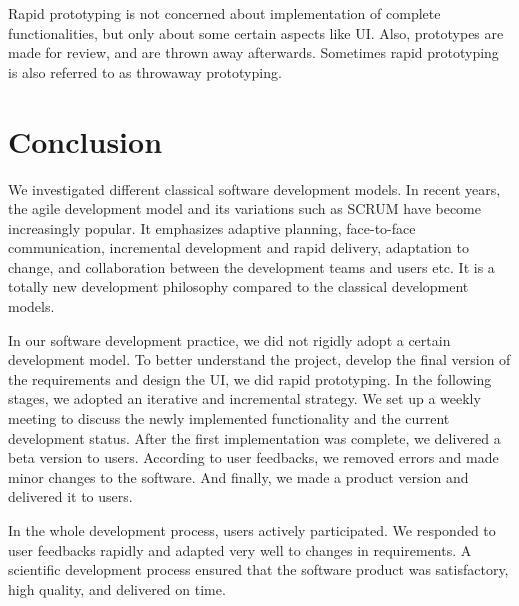 Rapid prototyping is not concerned about implementation of complete functionalities, but only about some certain aspects like UI. Also, prototypes are made for review, and are thrown away afterwards. Sometimes rapid prototyping is also referred to as throwaway prototyping.

\section{Conclusion}
We investigated different classical software development models. In recent years, the agile development model and its variations such as SCRUM \cite{schwaber2002agile} have become increasingly popular. It emphasizes adaptive planning, face-to-face communication, incremental development and rapid delivery, adaptation to change, and collaboration between the development teams and users etc. It is a totally new development philosophy compared to the classical development models.

In our software development practice, we did not rigidly adopt a certain development model. To better understand the project, develop the final version of the requirements and design the UI, we did rapid prototyping. In the following stages, we adopted an iterative and incremental strategy. We set up a weekly meeting to discuss the newly implemented functionality and the current development status. After the first implementation was complete, we delivered a beta version to users. According to user feedbacks, we removed errors and made minor changes to the software. And finally, we made a product version and delivered it to users.

In the whole development process, users actively participated. We responded to user feedbacks rapidly and adapted very well to changes in requirements. A scientific development process ensured that the software product was satisfactory, high quality, and delivered on time. 